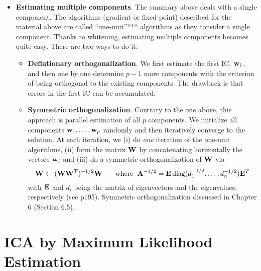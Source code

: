 \documentclass[a4paper]{book}
\begin{document}
\begin{itemize}
\item \textbf{Estimating multiple components}. The summary above deals with a single component. The algorithms (gradient or fixed-point) described for the material above are called ``one-unit''*** algorithms as they consider a single component. Thanks to whitening, estimating multiple components becomes quite easy. There are two ways to do it:
	\begin{itemize}
	\item \textbf{Deflationary orthogonalization}. We first estimate the first IC, $\mathbf w_1$, and then one by one determine $p-1$ more components with the criterion of being orthogonal to the existing components. The drawback is that errors in the first IC can be accumulated.
	\item \textbf{Symmetric orthogonalization}. Contrary to the one above, this approach is parallel estimation of all $p$ components. We initialize all components $\mathbf{w}_1,\hdots, \mathbf{w}_p$ randomly and then iteratively converge to the solution. At each iteration, we (i) do \textit{one} iteration of the one-unit algorithms, (ii) form the matrix $\mathbf W$ by concatenating horizontally the vectors $\mathbf w_i$ and (iii) do a symmetric orthogonalization of $\mathbf W$ via $$\mathbf{W} \gets (\mathbf{WW}^T)^{-1/2}\mathbf W\hspace{0.65cm}\text{where}\hspace{0.2cm} \mathbf{A}^{-1/2} = \mathbf E\, \text{diag}(d_1^{-1/2},\hdots,d_n^{-1/2}) \mathbf E^T$$ with $\mathbf E$ and $d_i$ being the matrix of eigenvectors and the eigenvalues, respectively  (see p195). Symmetric orthogonalization discussed in Chapter 6 (Section 6.5). 
	\end{itemize}
	
	
\end{itemize}













\chapter{ICA by Maximum Likelihood Estimation}
\end{document}
